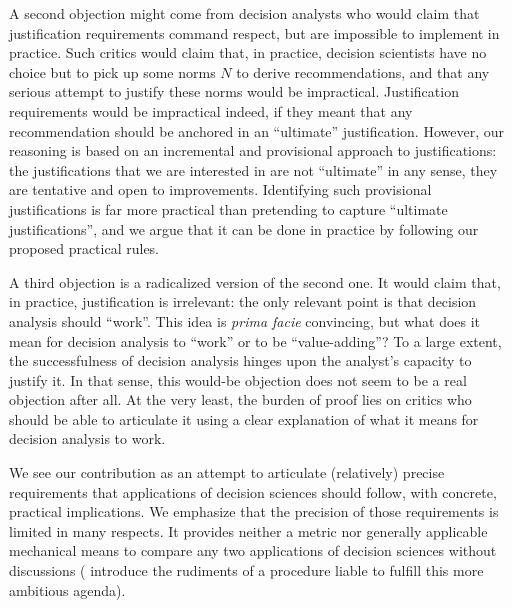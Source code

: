 \documentclass[preprint, french, english, 11pt, authoryear]{elsarticle}%
\begin{document}
A second objection might come from decision analysts who would claim that justification requirements command respect, but are impossible to implement in practice. Such critics would claim that, in practice, decision scientists have no choice but to pick up some norms $N$ to derive recommendations, and that any serious attempt to justify these norms would be impractical. Justification requirements would be impractical indeed, if they meant that any recommendation should be anchored in an “ultimate” justification. However, our reasoning is based on an incremental and provisional approach to justifications: the justifications that we are interested in are not ``ultimate'' in any sense, they are tentative and open to improvements. Identifying such provisional justifications is far more practical than pretending to capture ``ultimate justifications'', and we argue that it can be done in practice by following our proposed practical rules.

A third objection is a radicalized version of the second one. It would claim that, in practice, justification is irrelevant: the only relevant point is that decision analysis should ``work''. This idea is \emph{prima facie} convincing, but what does it mean for decision analysis to ``work'' or to be ``value-adding''? 
To a large extent, the successfulness of decision analysis hinges upon the analyst's capacity to justify it. In that sense, this would-be objection does not seem to be a real objection after all. At the very least, the burden of proof lies on critics who should be able to articulate it using a clear explanation of what it means for decision analysis to work. 

We see our contribution as an attempt to articulate (relatively) precise requirements that applications of decision sciences should follow, with concrete, practical implications. We emphasize that the precision of those requirements is limited in many respects.
It provides neither a metric nor generally applicable mechanical means to compare any two applications of decision sciences without discussions (\citet{cailloux_formal_2018} introduce the rudiments of a procedure liable to fulfill this more ambitious agenda).
\end{document}
